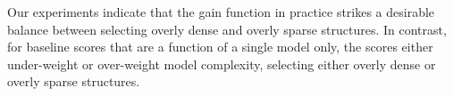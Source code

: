 \documentclass{article}
\begin{document}



%
Our experiments indicate that
the gain function in practice strikes a desirable balance between selecting overly dense and overly sparse structures.
In contrast, for baseline scores that are a function of a single model only, the scores either under-weight or over-weight model complexity, selecting either overly dense or overly sparse structures. 
\end{document}
